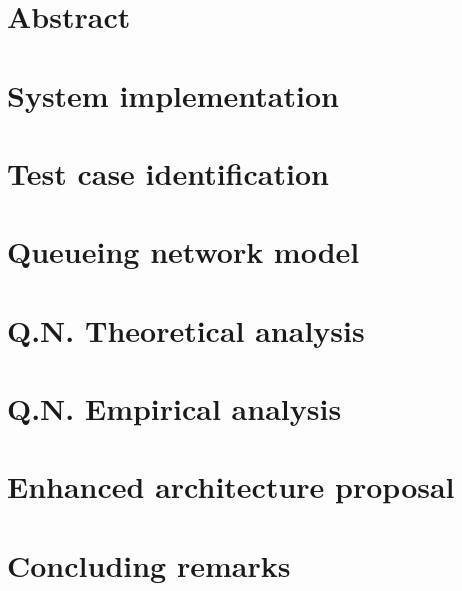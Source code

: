 \documentclass[12pt, twoside]{report}
\begin{document}
\tableofcontents
\listoftables
{}
\listoffigures
{}
\lstlistoflistings
{}

\chapter*{Abstract}


\chapter{System implementation}
\setcounter{page}{1}


\chapter{Test case identification}


\chapter{Queueing network model}


\chapter{Q.N. Theoretical analysis}


\chapter{Q.N. Empirical analysis}


\chapter{Enhanced architecture proposal}


\chapter{Concluding remarks}

\end{document}
